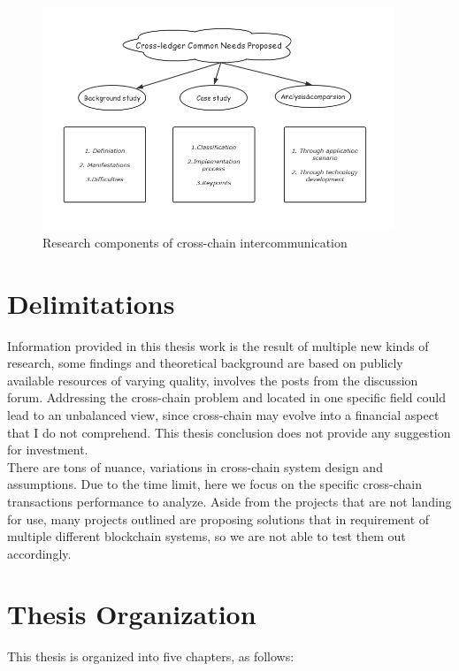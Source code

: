     \begin{figure}[H]
    \includegraphics[width=0.937\textwidth]{./figures/contri.png}
    \centering
    \caption{Research components of cross-chain intercommunication}%
    \centering
    \label{fig:contri}
    \end{figure}


\section{Delimitations}
\label{sec:d}
\noindent Information provided in this thesis work is the result of multiple new kinds of research, some findings and theoretical background are based on publicly available resources of varying quality, involves the posts from the discussion forum. Addressing the cross-chain problem and located in one specific field could lead to an unbalanced view, since cross-chain may evolve into a financial aspect that I do not comprehend. This thesis conclusion does not provide any suggestion for investment.\\

\noindent There are tons of nuance, variations in cross-chain system design and assumptions. Due to the time limit, here we focus on the specific cross-chain transactions performance to analyze. Aside from the projects that are not landing for use, many projects outlined are proposing solutions that in requirement of multiple different blockchain systems, so we are not able to test them out accordingly.

\section{Thesis Organization}
\label{sec:to}
This thesis is organized into five chapters, as follows:

